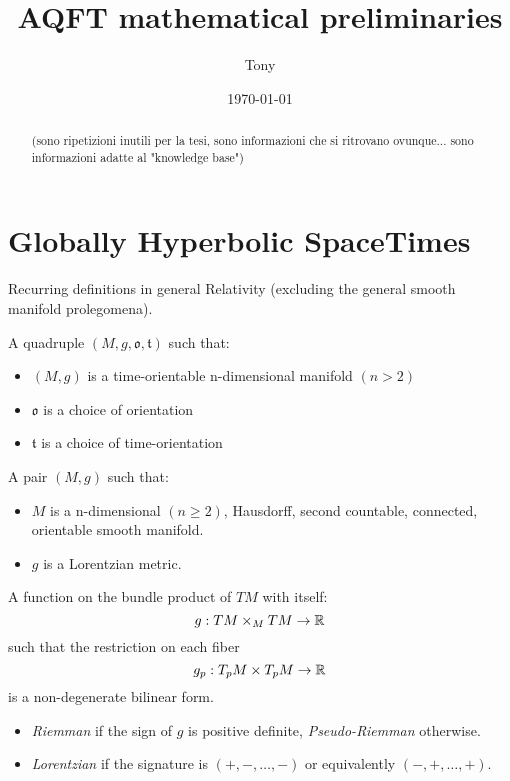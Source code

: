 \documentclass[a4paper,12pt]{scrartcl}    %
\begin{document}
	\title{AQFT mathematical preliminaries}
	\author{Tony}
	\date{\today}
\maketitle

\tableofcontents

\begin{abstract}
		(sono ripetizioni inutili per la tesi, sono informazioni che si ritrovano ovunque... sono informazioni adatte al "knowledge base")
\end{abstract}

\newpage
\section{Globally Hyperbolic SpaceTimes}
	Recurring definitions in general Relativity (excluding the general smooth manifold prolegomena).

	\begin{definition}
		A quadruple $(M, g, \mathfrak{o}, \mathfrak{t})$ such that:
		\begin{itemize}
			\item $(M,g)$ is a time-orientable n-dimensional manifold $(n>2)$
			\item $\mathfrak{o}$ is a choice of orientation
			\item $\mathfrak{t}$ is a choice of time-orientation
		\end{itemize}
	\end{definition}

	\begin{definition}
		A pair $(M, g)$ such that:
		\begin{itemize}
			\item $M$ is a n-dimensional $(n\geq2)$, Hausdorff, second countable, connected, orientable smooth manifold.
			\item $g$ is a Lorentzian metric.
		\end{itemize}
	\end{definition}
			
	\begin{definition}[Metric]
		A function on the bundle product of $TM$ with itself: $$g: TM \times_M TM \rightarrow \mathbb{R}$$ such that the restriction on each fiber $$g_p: T_pM \times T_pM \rightarrow \mathbb{R} $$ is a non-degenerate bilinear form.
	\end{definition}
	
	\begin{notationfix}
		 \begin{itemize}
		 	\item \emph{Riemman} if the sign of $g$ is positive definite, \emph{Pseudo-Riemman} otherwise.
		 	\item \emph{Lorentzian} if the signature is $(+, -, \ldots,- )$ or equivalently $(-,+,\ldots,+)$.
		 \end{itemize}
	\end{notationfix}
\end{document}
